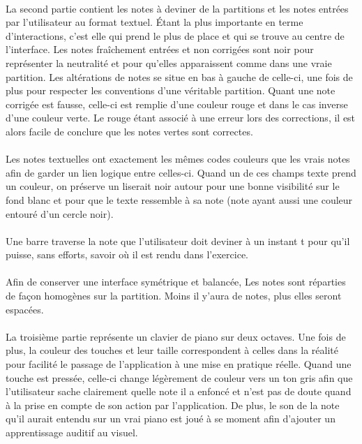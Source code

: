 \documentclass[a4paper, 12pt]{article}
\begin{document}
    \paragraph{}
    La second partie contient les notes à deviner de la partitions et les notes entrées par l'utilisateur au format textuel. Étant la plus importante en terme d'interactions, c'est elle qui prend le plus de place et qui se trouve au centre de l'interface. Les notes fraîchement entrées et non corrigées sont noir pour représenter la neutralité et pour qu'elles apparaissent comme dans une vraie partition. Les altérations de notes se situe en bas à gauche de celle-ci, une fois de plus pour respecter les conventions d'une véritable partition. Quant une note corrigée est fausse, celle-ci est remplie d'une couleur rouge et dans le cas inverse d'une couleur verte. Le rouge étant associé à une erreur lors des corrections, il est alors facile de conclure que les notes vertes sont correctes.
    
    \paragraph{}
    Les notes textuelles ont exactement les mêmes codes couleurs que les vrais notes afin de garder un lien logique entre celles-ci. Quand un de ces champs texte prend un couleur, on préserve un liserait noir autour pour une bonne visibilité sur le fond blanc et pour que le texte ressemble à sa note (note ayant aussi une couleur entouré d'un cercle noir).
    
    \paragraph{}
    Une barre traverse la note que l'utilisateur doit deviner à un instant t pour qu'il puisse, sans efforts, savoir où il est rendu dans l'exercice. 
    
    \paragraph{}
    Afin de conserver une interface symétrique et balancée, Les notes sont réparties de façon homogènes sur la partition. Moins il y'aura de notes, plus elles seront espacées.
    
    \paragraph{}
    La troisième partie représente un clavier de piano sur deux octaves. Une fois de plus, la couleur des touches et leur taille correspondent à celles dans la réalité pour facilité le passage de l'application à une mise en pratique réelle. Quand une touche est pressée, celle-ci change légèrement de couleur vers un ton gris afin que l'utilisateur sache clairement quelle note il a enfoncé et n'est pas de doute quand à la prise en compte de son action par l'application. De plus, le son de la note qu'il aurait entendu sur un vrai piano est joué à se moment afin d'ajouter un apprentissage auditif au visuel.
    
\end{document}
